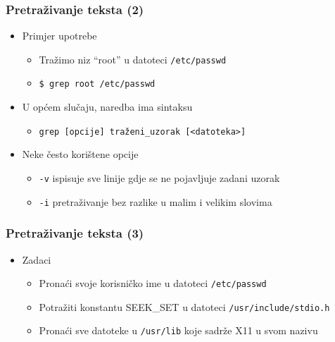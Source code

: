 \documentclass{beamer}
\newcommand{\shell}[1]{\texttt{#1}}
\begin{document}
\begin{frame}[t]
\frametitle{Pretraživanje teksta (2)}
\begin{itemize}
  \item Primjer upotrebe
  \begin{itemize}
    \item Tražimo niz “root” u datoteci \shell{/etc/passwd}
    \item[] \shell{\$ grep root /etc/passwd}
  \end{itemize}
  \item U općem slučaju, naredba ima sintaksu
  \begin{itemize}
    \item[] \shell{grep [opcije] traženi\_uzorak [<datoteka>]}
  \end{itemize}
  \item Neke često korištene opcije
  \begin{itemize}
    \item \shell{-v} ispisuje sve linije gdje se ne pojavljuje zadani 
          uzorak
    \item \shell{-i} pretraživanje bez razlike u malim i velikim slovima
  \end{itemize}
\end{itemize}
\end{frame}

\begin{frame}[t]
\frametitle{Pretraživanje teksta (3)}
\begin{itemize}
  \item Zadaci
  \begin{itemize}
    \item Pronaći svoje korisničko ime u datoteci \shell{/etc/passwd}
    \item Potražiti konstantu SEEK\_SET u datoteci 
          \shell{/usr/include/stdio.h}
    \item Pronaći sve datoteke u \shell{/usr/lib} koje sadrže X11 u svom 
          nazivu
  \end{itemize}
\end{itemize}
\end{frame}
\end{document}
